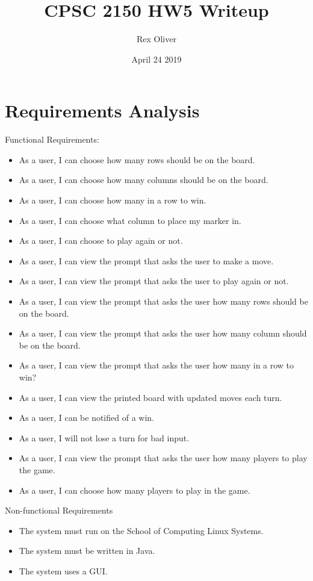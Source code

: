 \documentclass{article}
\title{CPSC 2150 HW5 Writeup}
\author{Rex Oliver}
\date{April 24 2019}
\begin{document}
\begin{titlepage}
  \maketitle
\end{titlepage}


\section{Requirements Analysis}
Functional Requirements:
\begin{itemize}
  \item As a user, I can choose how many rows should be on the board.
  \item As a user, I can choose how many columns should be on the board.
  \item As a user, I can choose how many in a row to win.
  \item As a user, I can choose what column to place my marker in.
  \item As a user, I can choose to play again or not.
  \item As a user, I can view the prompt that asks the user to make a move.
  \item As a user, I can view the prompt that asks the user to play again or
    not.
  \item As a user, I can view the prompt that asks the user how many rows should be on the board.
  \item As a user, I can view the prompt that asks the user how many column should be on the board.
  \item As a user, I can view the prompt that asks the user how many in a row to win? 
  \item As a user, I can view the printed board with updated moves each turn.
  \item As a user, I can be notified of a win.
  \item As a user, I will not lose a turn for bad input.
  \item As a user, I can view the prompt that asks the user how many players to play the game.
  \item As a user, I can choose how many players to play in the game.
\end{itemize}
Non-functional Requirements
\begin{itemize}
\item The system must run on the School of Computing Linux Systems.
\item The system must be written in Java.
\item The system uses a GUI.  
\end{itemize}  
\end{document}
